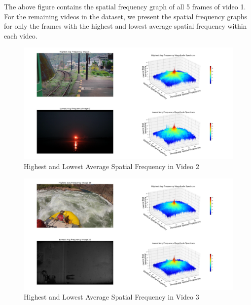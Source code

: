 \documentclass{ioereport}
\begin{document}
The above figure contains the spatial frequency graph of all 5 frames of video 1. For the remaining videos in the dataset, we present the spatial frequency graphs for only the frames with the highest and lowest average spatial frequency within each video.

\begin{figure}[H]
    \centering
    \includegraphics[width=\linewidth]{assets/spatial_frequency/video2spatialfreq.png}
    \caption{Highest and Lowest Average Spatial Frequency in Video 2}
    \label{fig:spatial-frequency-2}
\end{figure}

\begin{figure}[H]
    \centering
    \includegraphics[width=\linewidth]{assets/spatial_frequency/video3spatialfreq.png}
    \caption{Highest and Lowest Average Spatial Frequency in Video 3}
    \label{fig:spatial-frequency-3}
\end{figure}
\end{document}
